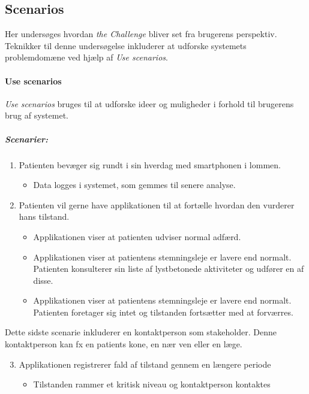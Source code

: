 \subsection{Scenarios}\label{sec:scenario}
Her undersøges hvordan \textit{the Challenge} bliver set fra brugerens perspektiv.
Teknikker til denne undersøgelse inkluderer at udforske systemets problemdomæne ved hjælp af \textit{Use scenarios}.

\paragraph{Use scenarios}
\textit{Use scenarios} bruges til at udforske ideer og muligheder i forhold til brugerens brug af systemet.

\subparagraph{Scenarier:}
\begin{enumerate}
	\item Patienten bevæger sig rundt i sin hverdag med smartphonen i lommen. \label{hverdag}
	\begin{itemize}
		\item Data logges i systemet, som gemmes til senere analyse.
	\end{itemize}
	
	\item Patienten vil gerne have applikationen til at fortælle hvordan den vurderer hans tilstand. \label{vurder}
	\begin{itemize}
		\item Applikationen viser at patienten udviser normal adfærd.
		\item Applikationen viser at patientens stemningsleje er lavere end normalt.
		Patienten konsulterer sin liste af lystbetonede aktiviteter og udfører en af disse.
		\item Applikationen viser at patientens stemningsleje er lavere end normalt.
		Patienten foretager sig intet og tilstanden fortsætter med at forværres.
	\end{itemize}
\end{enumerate}
Dette sidste scenarie inkluderer en kontaktperson som stakeholder.
Denne kontaktperson kan fx en patients kone, en nær ven eller en læge. 
\begin{enumerate}
	\setcounter{enumi}{2}
	\item Applikationen registrerer fald af tilstand gennem en længere periode \label{fald}
	\begin{itemize}
		\item Tilstanden rammer et kritisk niveau og kontaktperson kontaktes
	\end{itemize}
\end{enumerate}


